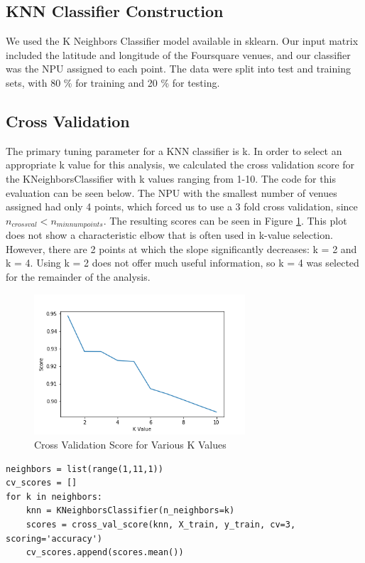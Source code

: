 \documentclass[11pt]{amsart}
\begin{document}
\subsection{KNN Classifier Construction}
We used the K Neighbors Classifier model available in sklearn. Our input matrix included the latitude and longitude of the Foursquare venues, and our classifier was the NPU assigned to each point. The data were split into test and training sets, with 80 \% for training and 20 \% for testing. 
\subsection{Cross Validation}
The primary tuning parameter for a KNN classifier is k. In order to select an appropriate k value for this analysis, we calculated the cross validation score for the KNeighborsClassifier with k values ranging from 1-10. The code for this evaluation can be seen below. The NPU with the smallest number of venues assigned had only 4 points, which forced us to use a 3 fold cross validation, since $n_{cross val} < n_{min num points}$. The resulting scores can be seen in Figure \ref{fig:kval}. 
This plot does not show a characteristic elbow that is often used in k-value selection. However, there are 2 points at which the slope significantly decreases: k = 2 and k = 4. Using k = 2 does not offer much useful information, so k = 4 was selected for the remainder of the analysis. 
\begin{figure}[h]
\includegraphics[width=0.7\textwidth]{kvalues}
\caption{Cross Validation Score for Various K Values}
\label{fig:kval}
\end{figure}

\begin{lstlisting}[caption={Cross Validation Testing}]
neighbors = list(range(1,11,1))
cv_scores = []
for k in neighbors:
    knn = KNeighborsClassifier(n_neighbors=k)
    scores = cross_val_score(knn, X_train, y_train, cv=3, scoring='accuracy')
    cv_scores.append(scores.mean())
\end{lstlisting}   
\end{document}
